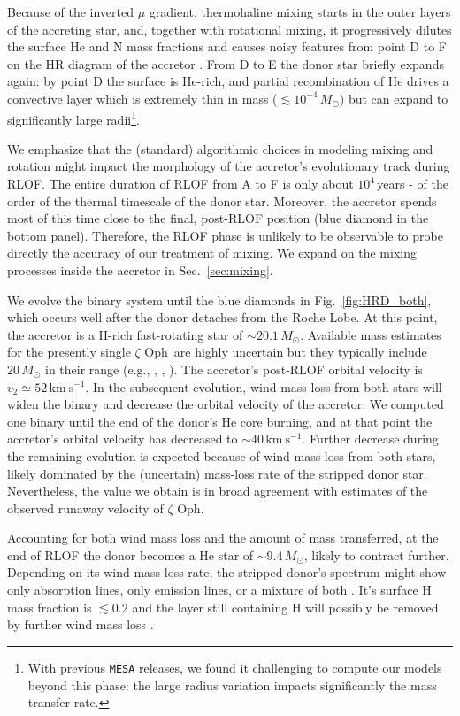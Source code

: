 \documentclass[twocolumn,twocolappendix,trackchanges]{aastex63}
\newcommand{\kms}{{\mathrm{km\ s^{-1}}}}
\DeclareRobustCommand{\Figref}[1]{Fig.~\ref{#1}}
\DeclareRobustCommand{\Secref}[1]{Sec.~\ref{#1}}
\newcommand{\zoph}{$\zeta$ Oph}
\begin{document}
Because of the inverted $\mu$ gradient, thermohaline mixing starts in
the outer layers of the accreting star, and, together with rotational
mixing, it progressively dilutes the surface He and N mass fractions
and causes noisy features from point D to F on the HR diagram of the
accretor \citep[e.g.,][]{cantiello:07}. From D to E the donor star
briefly expands again: by point D the surface is He-rich, and partial
recombination of He drives a convective layer which is extremely thin
in mass ($\lesssim 10^{-4}\,M_\odot$) but can expand to significantly
large radii\footnote{With previous \texttt{MESA} releases, we found it
  challenging to compute our models beyond this phase: the large
  radius variation impacts significantly the mass transfer rate.}.

We emphasize that the (standard) algorithmic choices in
modeling mixing and rotation might impact the morphology of the
accretor's evolutionary track during RLOF. The entire duration of RLOF
from A to F is only about $10^4$\,years - of the order of the thermal timescale of
the donor star. Moreover, the accretor spends most of this time close
to the final, post-RLOF position (blue diamond in the bottom
panel). Therefore, the RLOF phase is unlikely to be observable to
probe directly the accuracy of our treatment of mixing. We expand on
the mixing processes inside the accretor in \Secref{sec:mixing}.

We evolve the binary system until the blue diamonds in
\Figref{fig:HRD_both}, which occurs well after the donor detaches from
the Roche Lobe. At this point, the accretor is a H-rich fast-rotating
star of
$\sim$$20.1\,M_\odot$. Available mass estimates for the presently single \zoph\ are highly uncertain but they typically include
$20\,M_\odot$ in their range (e.g., \citealt{hoogerwerf:01}, , \citealt{neuhauser:20}). The accretor's post-RLOF orbital velocity is
$v_2\simeq52\,\kms$. In the subsequent evolution, wind mass loss from both stars will widen the binary and decrease the orbital velocity of the accretor. We computed one binary until the end of the donor's He core burning, and at that point the accretor's orbital velocity has decreased to
$\sim$$40\,\kms$. Further decrease during the remaining evolution
is expected because of wind mass loss from both stars, likely dominated by the
(uncertain) mass-loss rate of the stripped donor star. Nevertheless,
the value we obtain is in broad agreement with estimates of the
observed runaway velocity of \zoph.

Accounting for both wind mass loss and the amount of mass transferred,
at the end of RLOF the donor becomes a He star of
$\sim$$9.4\,M_\odot$, likely to contract further. Depending on its wind mass-loss rate, the stripped donor's spectrum might show only absorption lines, only emission lines, or a mixture of both \citep[e.g.,][]{crowther:07, neugent:17, gotberg:18}. It's surface H mass fraction is $\lesssim
0.2$ and the layer still containing H will possibly be removed by further wind mass loss \citep[e.g.,][]{gotberg:17}.
\end{document}
